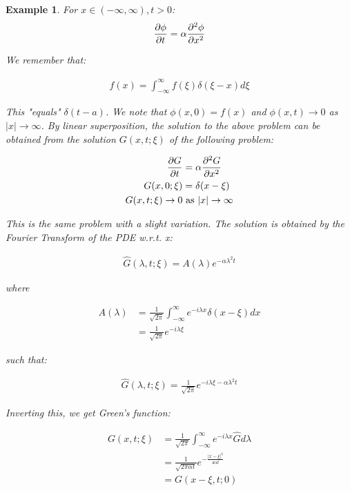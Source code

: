 \documentclass{article}
\newtheorem{ex}{Example}
\theoremstyle{definition}
\begin{document}
\begin{ex}
For $x \in (-\infty, \infty), t > 0$:
\begin{align*}
\pdv{\phi}{t} = \alpha \pdv{^2\phi}{x^2} 
\end{align*}

We remember that:

\begin{align*}
f(x) = \int_{-\infty}^{\infty}f(\xi)\delta(\xi-x) d\xi
\end{align*}

This "equals" $\delta(t-a)$. We note that $\phi(x,0) = f(x)$ and $\phi(x,t) \to 0$ as $|x| \to \infty$. By linear superposition, the solution to the above problem can be obtained from the solution $G(x,t;\xi)$ of the following problem:

\begin{align*}
\pdv{G}{t} &= \alpha \pdv{^2G}{x^2} \\
G(x,0;\xi) &= \delta(x-\xi) \\ 
G(x,t;\xi)  \to 0 &\text{ as } |x| \to \infty 
\end{align*}

This is the same problem with a slight variation. The solution is obtained by the Fourier Transform of the PDE w.r.t. x:

\begin{align*}
\hat{G}(\lambda, t;\xi) = A(\lambda)e^{-\alpha \lambda^2 t}
\end{align*}

where 

\begin{align*}
A(\lambda) & =  \frac{1}{\sqrt{2\pi}} \int_{-\infty}^{\infty} e^{- i \lambda x} \delta(x-\xi) dx \\
& =  \frac{1}{\sqrt{2\pi}} e^{- i \lambda \xi}
\end{align*}

such that:

\begin{align*}
\hat{G}(\lambda, t;\xi)  = \frac{1}{\sqrt{2\pi}} e^{- i \lambda \xi - \alpha \lambda^2 t}
\end{align*}

Inverting this, we get Green's function:

\begin{align*}
G(x,t;\xi) &=  \frac{1}{\sqrt{2\pi}} \int_{-\infty}^{\infty} e^{- i \lambda x}\hat{G} d\lambda \\& = \frac{1}{\sqrt{2\pi \alpha t}} e^{-\frac{|x-\xi|^2}{4 \alpha t}} \\ 
& = G(x-\xi, t; 0)
\end{align*}
\end{ex}
\end{document}
